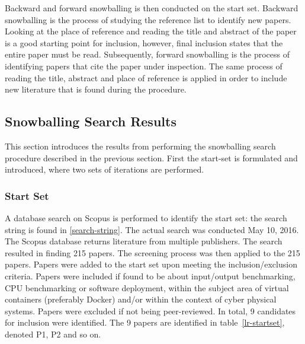 Backward and forward snowballing is then conducted on the start set. Backward snowballing is the process of studying the reference list to identify new papers. Looking at the place of reference and reading the title and abstract of the paper is a good starting point for inclusion, however, final inclusion states that the entire paper must be read. Subsequently, forward snowballing is the process of identifying papers that cite the paper under inspection. The same process of reading the title, abstract and place of reference is applied in order to include new literature that is found during the procedure. 



\subsection{Snowballing Search Results}
This section introduces the results from performing the snowballing search procedure described in the previous section. First the start-set is formulated and introduced, where two sets of iterations are performed. 

\subsubsection*{Start Set}
A database search on Scopus \cite{scopus} is performed to identify the start set: the search string is found in \ref{search-string}.  The actual search was conducted May 10, 2016. The Scopus database returns literature from multiple publishers. The search resulted in finding 215 papers. The screening process was then applied to the 215 papers. Papers were added to the start set upon meeting the inclusion/exclusion criteria. Papers were included if found to be about input/output benchmarking, CPU benchmarking or software deployment, within the subject area of virtual containers (preferably Docker) and/or within the context of cyber physical systems. Papers were excluded if not being peer-reviewed. In total, 9 candidates for inclusion were identified. The 9 papers are identified in table~\ref{lr-startset}, denoted P1, P2 and so on.

